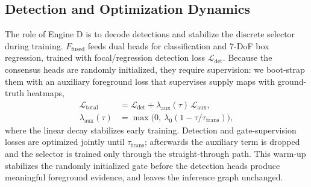 \subsection{Detection and Optimization Dynamics}
\label{subsec:dynamics}
The role of Engine D is to decode detections and stabilize the discrete selector during training. $F_{\text{fused}}$ feeds dual heads for classification and 7-DoF box regression, trained with focal/regression detection loss $\mathcal{L}_{\text{det}}$. Because the consensus heads are randomly initialized, they require supervision: we boot-strap them with an auxiliary foreground loss that supervises supply maps with ground-truth heatmaps,
\begin{equation}
\begin{split}
  \mathcal{L}_{\text{total}} &= \mathcal{L}_{\text{det}} + \lambda_{\text{aux}}(\tau)\,\mathcal{L}_{\text{aux}}, \\
  \lambda_{\text{aux}}(\tau) &= \max\!\big(0,\ \lambda_0 (1 - \tau/\tau_{\text{trans}})\big),
\end{split}
\end{equation}
where the linear decay stabilizes early training. Detection and gate-supervision losses are optimized jointly until $\tau_{\text{trans}}$; afterwards the auxiliary term is dropped and the selector is trained only through the straight-through path. This warm-up stabilizes the randomly initialized gate before the detection heads produce meaningful foreground evidence, and leaves the inference graph unchanged.


